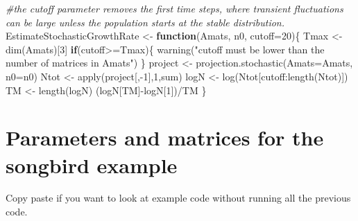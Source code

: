 \documentclass[
]{book}
\newenvironment{Shaded}{\begin{snugshade}}{\end{snugshade}}
\newcommand{\AttributeTok}[1]{\textcolor[rgb]{0.77,0.63,0.00}{#1}}
\newcommand{\CommentTok}[1]{\textcolor[rgb]{0.56,0.35,0.01}{\textit{#1}}}
\newcommand{\ControlFlowTok}[1]{\textcolor[rgb]{0.13,0.29,0.53}{\textbf{#1}}}
\newcommand{\DecValTok}[1]{\textcolor[rgb]{0.00,0.00,0.81}{#1}}
\newcommand{\FunctionTok}[1]{\textcolor[rgb]{0.00,0.00,0.00}{#1}}
\newcommand{\NormalTok}[1]{#1}
\newcommand{\OtherTok}[1]{\textcolor[rgb]{0.56,0.35,0.01}{#1}}
\newcommand{\SpecialCharTok}[1]{\textcolor[rgb]{0.00,0.00,0.00}{#1}}
\newcommand{\StringTok}[1]{\textcolor[rgb]{0.31,0.60,0.02}{#1}}
\begin{document}
\begin{Shaded}
\begin{Highlighting}[]
\CommentTok{\#the cutoff parameter removes the first time steps, where transient fluctuations can be large unless the population starts at the stable distribution. }
\NormalTok{EstimateStochasticGrowthRate }\OtherTok{\textless{}{-}} \ControlFlowTok{function}\NormalTok{(Amats, n0, }\AttributeTok{cutoff=}\DecValTok{20}\NormalTok{)\{}
\NormalTok{  Tmax }\OtherTok{\textless{}{-}} \FunctionTok{dim}\NormalTok{(Amats)[}\DecValTok{3}\NormalTok{]}
    \ControlFlowTok{if}\NormalTok{(cutoff}\SpecialCharTok{\textgreater{}=}\NormalTok{Tmax)\{}
      \FunctionTok{warning}\NormalTok{(}\StringTok{"cutoff must be lower than the number of matrices in Amats"}\NormalTok{)}
\NormalTok{      \}}
\NormalTok{  project }\OtherTok{\textless{}{-}} \FunctionTok{projection.stochastic}\NormalTok{(}\AttributeTok{Amats=}\NormalTok{Amats, }\AttributeTok{n0=}\NormalTok{n0) }
\NormalTok{  Ntot }\OtherTok{\textless{}{-}} \FunctionTok{apply}\NormalTok{(project[,}\SpecialCharTok{{-}}\DecValTok{1}\NormalTok{],}\DecValTok{1}\NormalTok{,sum)}
\NormalTok{  logN }\OtherTok{\textless{}{-}} \FunctionTok{log}\NormalTok{(Ntot[cutoff}\SpecialCharTok{:}\FunctionTok{length}\NormalTok{(Ntot)])}
\NormalTok{  TM }\OtherTok{\textless{}{-}} \FunctionTok{length}\NormalTok{(logN)}
\NormalTok{  (logN[TM]}\SpecialCharTok{{-}}\NormalTok{logN[}\DecValTok{1}\NormalTok{])}\SpecialCharTok{/}\NormalTok{TM}
\NormalTok{\}}
\end{Highlighting}
\end{Shaded}

\hypertarget{parameters-and-matrices-for-the-songbird-example}{%
\section{Parameters and matrices for the songbird example}\label{parameters-and-matrices-for-the-songbird-example}}

Copy paste if you want to look at example code without running all the previous code.
\end{document}

